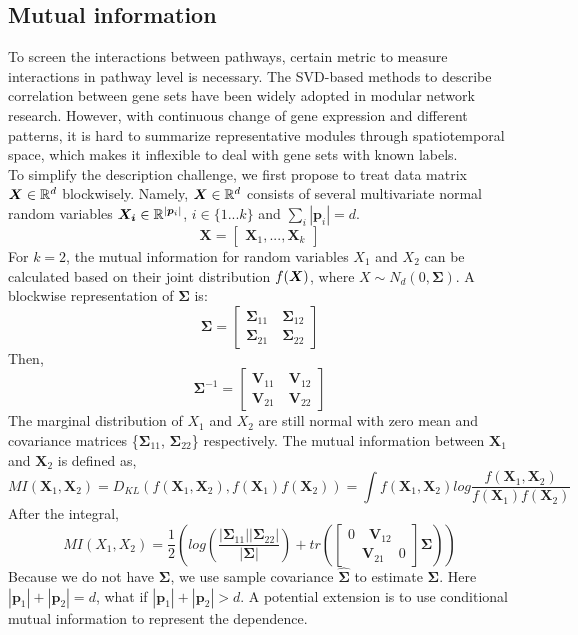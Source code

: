 \documentclass[11pt]{article}
\begin{document}
\subsection{Mutual information}
To screen the interactions between pathways, certain metric to measure interactions in pathway level is necessary. The SVD-based methods to describe correlation between gene sets have been widely adopted in modular network research. However, with continuous change of gene expression and different patterns, it is hard to summarize representative modules through spatiotemporal space, which makes it inflexible to deal with gene sets with known labels. \\
To simplify the description challenge, we first propose to treat data matrix $\bm{X} \in \mathbb{R}^d$ blockwisely. Namely, $\bm{X} \in \mathbb{R}^d$ consists of several multivariate normal random variables $\bm{X_i} \in \mathbb{R}^{|\bm{p}_i|}$, $i\in\{1...k\}$ and $\sum_i |\bm{p}_i|= d$.
\[\bm{X}=
\begin{bmatrix}
\bm{X}_1, ..., \bm{X}_k
\end{bmatrix}
\]
For $k=2$, the mutual information for random variables $X_1$ and $X_2$ can be calculated based on their joint distribution $f(\bm{X})$, where $X \sim N_d(0, \bm{\Sigma})$. A blockwise representation of $\bm{\Sigma}$ is: 
\[
\bm{\Sigma}=
\begin{bmatrix}
\bm{\Sigma}_{11}\quad \bm{\Sigma}_{12}\\ \bm{\Sigma}_{21} \quad \bm{\Sigma}_{22}
\end{bmatrix}
\]
Then,
\[
\bm{\Sigma}^{-1} = 
\begin{bmatrix}
\bm{V}_{11}\quad \bm{V}_{12}\\ \bm{V}_{21} \quad \bm{V}_{22}
\end{bmatrix}
\]
The marginal distribution of $X_1$ and $X_2$ are still normal with zero mean and covariance matrices \{$\bm{\Sigma}_{11}$, $\bm{\Sigma}_{22}$\} respectively. The mutual information between $\bm{X}_1$ and $\bm{X}_2$ is defined as,
\[
MI(\bm{X}_1, \bm{X}_2) = D_{KL}(f(\bm{X}_1, \bm{X}_2), f(\bm{X}_1)f(\bm{X}_2)) = \int f(\bm{X}_1, \bm{X}_2)log\frac{f(\bm{X}_1, \bm{X}_2)}{f(\bm{X}_1)f(\bm{X}_2)}
\]
After the integral, 
\[
MI(X_1, X_2) = \frac{1}{2}(log(\frac{|\bm{\Sigma}_{11}||\bm{\Sigma}_{22}|}{|\bm{\Sigma}|}) + tr(
\begin{bmatrix}
0\quad\bm{V}_{12}\\
\quad\bm{V}_{21}\quad0
\end{bmatrix}
\bm{\Sigma}))
\]
Because we do not have $\bm{\Sigma}$, we use sample covariance $\hat{\bm{\Sigma}}$ to estimate $\bm{\Sigma}$. Here $|\bm{p}_1| + |\bm{p}_2| = d$, what if $|\bm{p}_1| + |\bm{p}_2|  > d$. A potential extension is to use conditional mutual information to represent the dependence. \\
\end{document}
